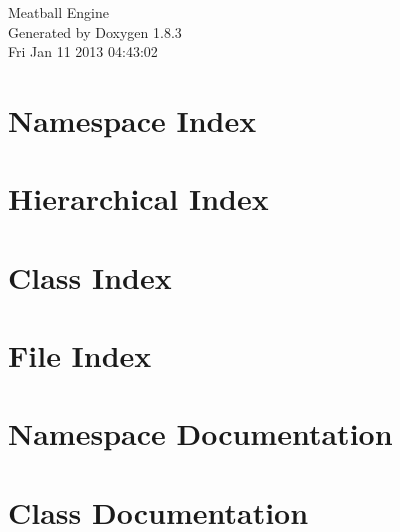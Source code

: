 \documentclass{book}
\begin{document}
\hypersetup{pageanchor=false,citecolor=blue}
\begin{titlepage}
\vspace*{7cm}
\begin{center}
{\Large Meatball Engine }\\
\vspace*{1cm}
{\large Generated by Doxygen 1.8.3}\\
\vspace*{0.5cm}
{\small Fri Jan 11 2013 04:43:02}\\
\end{center}
\end{titlepage}
\clearemptydoublepage
{}
\tableofcontents
\clearemptydoublepage
{}
\hypersetup{pageanchor=true,citecolor=blue}
\chapter{Namespace Index}

\chapter{Hierarchical Index}

\chapter{Class Index}

\chapter{File Index}

\chapter{Namespace Documentation}

\chapter{Class Documentation}
























\end{document}

